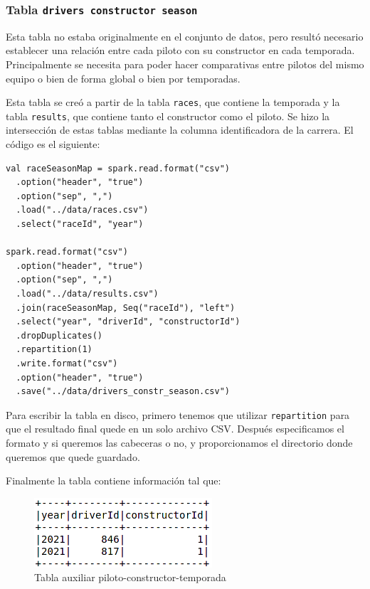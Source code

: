 \documentclass[12pt,twoside,titlepage]{report}
\begin{document}
\subsubsection{Tabla \texttt{drivers constructor season}} \label{drivconstseasontabexplanation}

Esta tabla no estaba originalmente en el conjunto de datos, pero resultó necesario establecer una relación entre cada piloto con su constructor en cada temporada. Principalmente se necesita para poder hacer comparativas entre pilotos del mismo equipo o bien de forma global o bien por temporadas. 

Esta tabla se creó a partir de la tabla \texttt{races}, que contiene la temporada y la tabla \texttt{results}, que contiene tanto el constructor como el piloto. Se hizo la intersección de estas tablas mediante la columna identificadora de la carrera. El código es el siguiente:


\begin{lstlisting}
val raceSeasonMap = spark.read.format("csv")
  .option("header", "true")
  .option("sep", ",")
  .load("../data/races.csv")
  .select("raceId", "year")

spark.read.format("csv")
  .option("header", "true")
  .option("sep", ",")
  .load("../data/results.csv")
  .join(raceSeasonMap, Seq("raceId"), "left")
  .select("year", "driverId", "constructorId")
  .dropDuplicates()
  .repartition(1)
  .write.format("csv")
  .option("header", "true")
  .save("../data/drivers_constr_season.csv")
\end{lstlisting}

Para escribir la tabla en disco, primero tenemos que utilizar \texttt{repartition} para que el resultado final quede en un solo archivo CSV. Después especificamos el formato y si queremos las cabeceras o no, y proporcionamos el directorio donde queremos que quede guardado.

Finalmente la tabla contiene información tal que:

\begin{figure}[H]
  \includegraphics[scale=0.4]{driv_const_ssn_table.png}
  \centering
  \caption{Tabla auxiliar piloto-constructor-temporada}
  \label{fig:driv_const_ssn_table}
  \centering
\end{figure}
\end{document}

